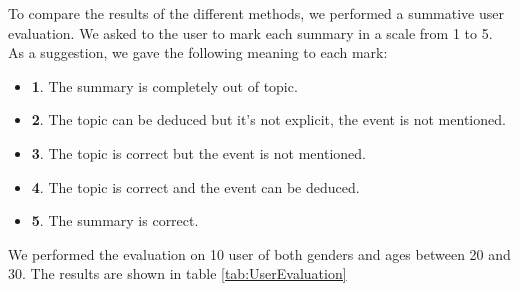 To compare the results of the different methods, we performed a summative user evaluation. We asked to the user to mark each summary in a scale from 1 to 5. As a suggestion, we gave the following meaning to each mark:
\begin{itemize}
\item \textbf{1}. The summary is completely out of topic.
\item \textbf{2}. The topic can be deduced but it's not explicit, the event is not mentioned.
\item \textbf{3}. The topic is correct but the event is not mentioned.
\item \textbf{4}. The topic is correct and the event can be deduced.
\item \textbf{5}. The summary is correct.
\end{itemize}

We performed the evaluation on 10 user of both genders and ages between 20 and 30. The results are shown in table \ref{tab:UserEvaluation}


